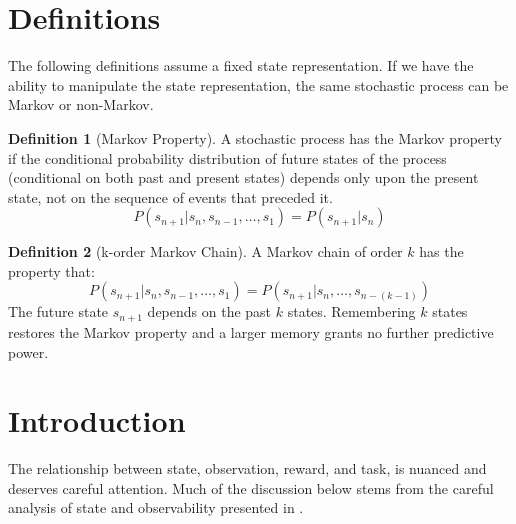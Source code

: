 \documentclass{article} %
\title{}
\author{}
\theoremstyle{definition}
\newtheorem{definition}{Definition}[section]
\begin{document}
\maketitle

\begin{abstract}
We seek to contribute:\\
1) A clear understanding of Partial Observability as it relates to
state, agent, and task.\\
2) A measure of the degree to which a domain is partially observable.\\
3) A way to quantify the deficiency of a given state representation.\\
\end{abstract}

\section{Definitions}
The following definitions assume a fixed state representation. If we
have the ability to manipulate the state representation, the same
stochastic process can be Markov or non-Markov.

\begin{definition}[Markov Property]
\label{def:markov}
A stochastic process has the Markov property if the conditional
probability distribution of future states of the process (conditional
on both past and present states) depends only upon the present state,
not on the sequence of events that preceded it.
\[
P(s_{n+1} | s_{n}, s_{n-1}, \dots, s_{1}) = P(s_{n+1} | s_{n})
\]
\end{definition}

\begin{definition}[k-order Markov Chain]
A Markov chain of order $k$ has the property that:
\[
P(s_{n+1} | s_{n}, s_{n-1}, \dots, s_{1}) = P(s_{n+1} | s_{n}, \dots, s_{n-(k-1)})
\]
The future state $s_{n+1}$ depends on the past $k$ states. Remembering
$k$ states restores the Markov property and a larger memory grants no
further predictive power.
\end{definition}

\section{Introduction}
The relationship between state, observation, reward, and task, is
nuanced and deserves careful attention. Much of the discussion below
stems from the careful analysis of state and observability presented
in \cite{McCallum96}.
\end{document}
